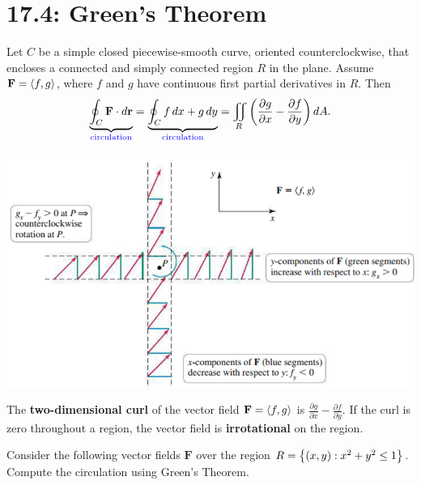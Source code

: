 \documentclass[mathNotesPreamble]{subfiles}
\begin{document}
\section{17.4: Green's Theorem}

  \begin{thmBox*}
    Let $C$ be a simple closed piecewise-smooth curve, oriented counterclockwise, that encloses a connected and simply connected region $R$ in the plane. Assume $\mathbf F={\left\langle f,g \right\rangle}$, where $f$ and $g$ have continuous first partial derivatives in $R$. Then
      \[\underbrace{\oint_C \mathbf F\cdot d{\mathbf{r}}}_{\textcolor{blue}{\textnormal{circulation}}}=\underbrace{\oint_C f\,dx+g\,dy}_{\textcolor{blue}{\textnormal{circulation}}}=\iint\limits_R{\left(\frac{\partial g}{\partial x}-\frac{\partial f}{\partial y}\right)}\,dA.\]
  \end{thmBox*}

  \begin{flushright}
    \includegraphics[width=0.825\linewidth]{images/briggs_17_04/fig17_32}
  \end{flushright}

  \begin{defn*}
    The \textbf{two-dimensional curl} of the vector field $\mathbf F={\left\langle f,g \right\rangle}$ is $\displaystyle \frac{\partial g}{\partial x}-\frac{\partial f}{\partial y}$. If the curl is zero throughout a region, the vector field is \textbf{irrotational} on the region.
  \end{defn*}
  \pagebreak

  \noindent
  \begin{ex*}
    Consider the following vector fields $\mathbf F$ over the region $R={\left\{(x,y): x^2+y^2\leq 1\right\}}$. Compute the circulation using Green's Theorem.
  \end{ex*}
  
\end{document}
